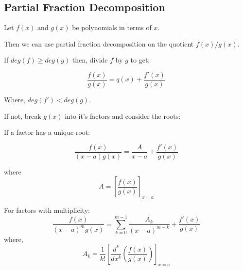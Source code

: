 \subsection{Partial Fraction Decomposition}


Let $f(x)$ and $g(x)$ be polynomials in terms of $x$.

Then we can use partial fraction decomposition on the quotient $f(x)/g(x)$.


\begin{case}

If $deg(f) \geq deg(g)$ then, divide $f$ by $g$ to get:

\[\frac{f(x)}{g(x)} = q(x) + \frac{f'(x)}{g(x)}\]

Where, $deg(f') < deg(g)$.
\end{case}

\smallskip

\begin{case}
If not, break $g(x)$ into it's factors and consider the roots:

\smallskip

If a factor has a unique root:

\[\frac{f(x)}{(x-a)g(x)} = \frac{A}{x-a} + \frac{f'(x)}{g(x)}\]

where
\[A = \left[\frac{f(x)}{g(x)}\right]_{x=a}\]

\smallskip

For factors with multiplicity:
\[\frac{f(x)}{(x-a)^{m} g(x)} = \sum_{k=0}^{m-1} \frac{A_{k}}{(x-a)^{m-k}} + \frac{f'(x)}{g(x)}\]
where,
\[A_{k} = \frac{1}{k!}\left[ \frac{d^{k}}{dx^{k}} \left(\frac{f(x)}{g(x)}\right)\right]_{x=a}\]

\end{case}